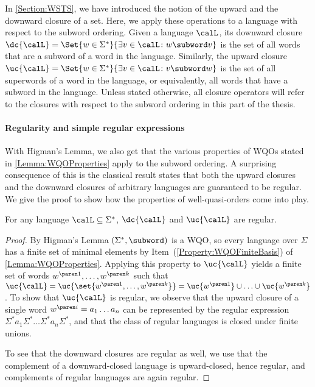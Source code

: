 \documentclass[../../diss.tex]{subfiles}
\begin{document}
In \cref{Section:WSTS}, we have introduced the notion of the upward and the downward closure of a set.
Here, we apply these operations to a language with respect to the subword ordering.
Given a language $\calL$, its downward closure
\(
    \dc{\calL} = \Set{ w \in \Sigma^*}{ \exists v \in \calL \colon w \subword v}
\)
is the set of all words that are a subword of a word in the language.
Similarly, the upward closure
\(
    \uc{\calL} = \Set{ w \in \Sigma^*}{ \exists v \in \calL \colon v \subword w}
\)
is the set of all superwords of a word in the language, or equivalently, all words that have a subword in the language.
Unless stated otherwise, all closure operators will refer to the closures with respect to the subword ordering in this part of the thesis.

\paragraph{Regularity and simple regular expressions}

With Higman's Lemma, we also get that the various properties of WQOs stated in \cref{Lemma:WQOProperties} apply to the subword ordering.
A surprising consequence of this is the classical result states that both the upward closures and the downward closures of arbitrary languages are guaranteed to be regular.
We give the proof to show how the properties of well-quasi-orders come into play.

\begin{theorem}%
\label{Theorem:Haines}%
    For any language $\calL \subseteq \Sigma^*$, $\dc{\calL}$ and $\uc{\calL}$ are regular.
\end{theorem}

\begin{proof}
    By Higman's Lemma $(\Sigma^*,\subword)$ is a WQO, so every language over $\Sigma$ has a finite set of minimal elements by Item~(\ref{Property:WQOFiniteBasis}) of \cref{Lemma:WQOProperties}.
    Applying this property to $\uc{\calL}$ yields a finite set of words $\itr{w}{1}, \ldots, \itr{w}{k}$ such that $\uc{\calL} = \uc{\set{ \itr{w}{1}, \ldots, \itr{w}{k}}} = \uc{\itr{w}{1}} \cup \ldots \cup \uc{\itr{w}{k}}$.
%
    To show that $\uc{\calL}$ is regular, we observe that the upward closure of a single word $\itr{w}{i} = a_1 \ldots a_n$ can be represented by the regular expression $\Sigma^* a_1 \Sigma^* \ldots \Sigma^* a_n \Sigma^*$, and that the class of regular languages is closed under finite unions.

    To see that the downward closures are regular as well, we use that the complement of a downward-closed language is upward-closed, hence regular, and complements of regular languages are again regular.
\end{proof}
\end{document}
